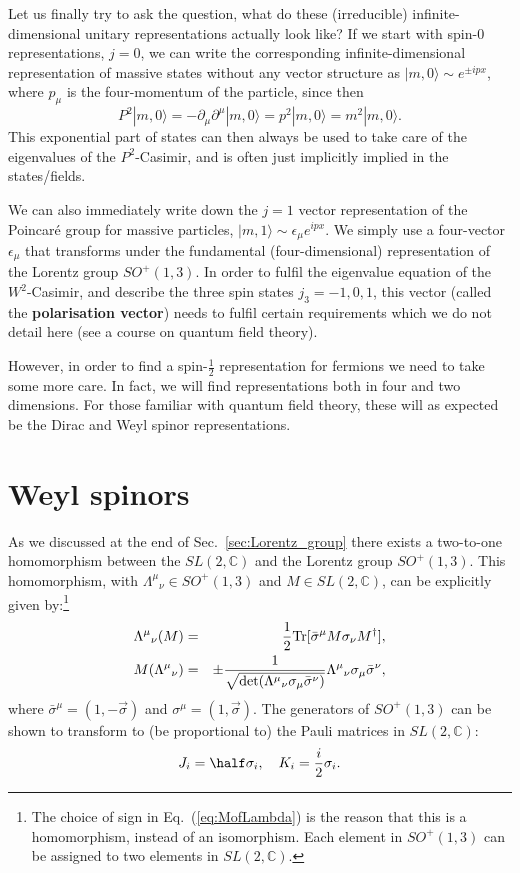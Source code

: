 \documentclass[notes.tex]{subfiles}
\begin{document}
\bigskip
Let us finally try to ask the question, what do these (irreducible) infinite-dimensional unitary representations actually look like? If we start with spin-0 representations, $j=0$, we can write the corresponding infinite-dimensional representation of massive states without any vector structure as $|m,0\rangle\sim e^{\pm ipx}$, where $p_\mu$ is the four-momentum of the particle, since then
\[P^2|m,0\rangle=-\partial_\mu\partial^\mu|m,0\rangle = p^2|m,0\rangle=m^2|m,0\rangle.\] 
This exponential part of states can then always be used to take care of the eigenvalues of the $P^2$-Casimir, and is often just implicitly implied in the states/fields.

We can also immediately write down the $j=1$ vector representation of the Poincaré group for massive particles, $|m,1\rangle\sim\epsilon_\mu e^{ipx}$. We simply use a four-vector $\epsilon_\mu$ that transforms under the fundamental (four-dimensional) representation of the Lorentz group $SO^+(1,3)$. In order to fulfil the eigenvalue equation of the $W^2$-Casimir, and describe the three spin states $j_3=-1,0,1$, this vector (called the {\bf polarisation vector}) needs to fulfil certain requirements which we do not detail here (see a course on quantum field theory).

However, in order to find a spin-$\frac{1}{2}$ representation for fermions we need to take some more care. 
In fact, we will find representations both in four and two dimensions. For those familiar with quantum field theory, these will as expected be the Dirac and Weyl spinor representations.



\section{Weyl spinors}
\label{sec:weyl}
As we discussed at the end of Sec.~\ref{sec:Lorentz_group} there exists a two-to-one homomorphism between the  $SL(2, \mathbb{C})$ and the Lorentz group $SO^+(1,3)$. This homomorphism, with $\Lambda^\mu{}_\nu \in SO^+(1,3)$ and $M \in SL(2, \mathbb{C})$, can be explicitly given by:\footnote{The choice of sign in Eq.~(\ref{eq:MofLambda}) is the reason that this is a homomorphism, instead of an isomorphism. Each element in  $SO^+(1,3)$ can be assigned to two elements in $SL(2, \mathbb{C})$.}
\begin{eqnarray}
\Lambda^\mu{}_\nu(M) &=& \frac{1}{2}{\rm Tr}[\bar{\sigma}^\mu M \sigma_\nu M^\dagger],\label{eq:LambdaofM}\\
M(\Lambda^\mu{}_\nu) &=& \pm \frac{1}{\sqrt{\det(\Lambda^\mu{}_\nu \sigma_\mu \bar{\sigma}^\nu)}}\Lambda^\mu{}_\nu \sigma_\mu \bar{\sigma}^\nu,\label{eq:MofLambda}
\end{eqnarray}
where $\bar{\sigma}^\mu = (1, -\vec{\sigma})$ and $\sigma^\mu = (1, \vec{\sigma})$. The generators of $SO^+(1,3)$ can be shown to transform to (be proportional to) the Pauli matrices in $SL(2,\mathbb C)$:
\[ J_i=\half \sigma_i, \quad K_i=\frac{i}{2}\sigma_i. \]
\end{document}

